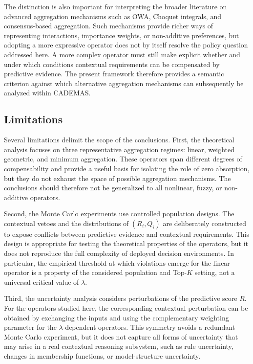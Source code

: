 \documentclass[mathematics,article,submit,moreauthors]{Definitions/mdpi}
\begin{document}
The distinction is also important for interpreting the broader literature
on advanced aggregation mechanisms such as OWA, Choquet integrals, and
consensus-based aggregation. Such mechanisms provide richer ways of
representing interactions, importance weights, or non-additive preferences,
but adopting a more expressive operator does not by itself resolve the
policy question addressed here. A more complex operator must still make
explicit whether and under which conditions contextual requirements can be
compensated by predictive evidence. The present framework therefore
provides a semantic criterion against which alternative aggregation
mechanisms can subsequently be analyzed within CADEMAS.

\subsection{Limitations}
\label{subsec:discussion-limitations}

Several limitations delimit the scope of the conclusions. First, the
theoretical analysis focuses on three representative aggregation regimes:
linear, weighted geometric, and minimum aggregation. These operators span
different degrees of compensability and provide a useful basis for
isolating the role of zero absorption, but they do not exhaust the space of
possible aggregation mechanisms. The conclusions should therefore not be
generalized to all nonlinear, fuzzy, or non-additive operators.

Second, the Monte Carlo experiments use controlled population designs.
The contextual vetoes and the distributions of $(R_i,Q_i)$ are deliberately
constructed to expose conflicts between predictive evidence and contextual
requirements. This design is appropriate for testing the theoretical
properties of the operators, but it does not reproduce the full complexity
of deployed decision environments. In particular, the empirical threshold
at which violations emerge for the linear operator is a property of the
considered population and Top-$K$ setting, not a universal critical value
of $\lambda$.

Third, the uncertainty analysis considers perturbations of the predictive
score $R$. For the operators studied here, the corresponding contextual
perturbation can be obtained by exchanging the inputs and using the
complementary weighting parameter for the $\lambda$-dependent operators.
This symmetry avoids a redundant Monte Carlo experiment, but it does not
capture all forms of uncertainty that may arise in a real contextual
reasoning subsystem, such as rule uncertainty, changes in membership
functions, or model-structure uncertainty.
\end{document}
